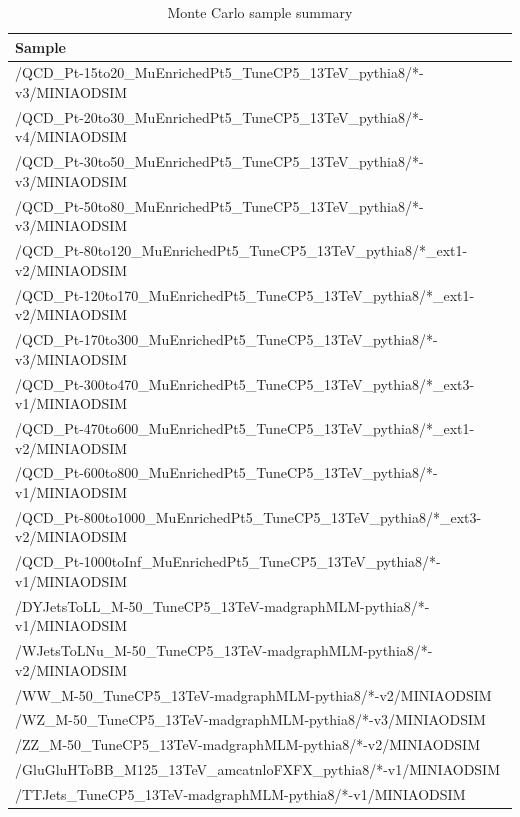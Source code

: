 \begin{table}[htb]
  \caption{Monte Carlo sample summary}
  \begin{center}
    \footnotesize
    \begin{tabular}{l}\hline
      Sample \\
      \hline
      /QCD\_Pt-15to20\_MuEnrichedPt5\_TuneCP5\_13TeV\_pythia8/*-v3/MINIAODSIM \\
      /QCD\_Pt-20to30\_MuEnrichedPt5\_TuneCP5\_13TeV\_pythia8/*-v4/MINIAODSIM \\
      /QCD\_Pt-30to50\_MuEnrichedPt5\_TuneCP5\_13TeV\_pythia8/*-v3/MINIAODSIM \\
      /QCD\_Pt-50to80\_MuEnrichedPt5\_TuneCP5\_13TeV\_pythia8/*-v3/MINIAODSIM \\
      /QCD\_Pt-80to120\_MuEnrichedPt5\_TuneCP5\_13TeV\_pythia8/*\_ext1-v2/MINIAODSIM \\
      /QCD\_Pt-120to170\_MuEnrichedPt5\_TuneCP5\_13TeV\_pythia8/*\_ext1-v2/MINIAODSIM \\
      /QCD\_Pt-170to300\_MuEnrichedPt5\_TuneCP5\_13TeV\_pythia8/*-v3/MINIAODSIM \\
      /QCD\_Pt-300to470\_MuEnrichedPt5\_TuneCP5\_13TeV\_pythia8/*\_ext3-v1/MINIAODSIM \\
      /QCD\_Pt-470to600\_MuEnrichedPt5\_TuneCP5\_13TeV\_pythia8/*\_ext1-v2/MINIAODSIM \\
      /QCD\_Pt-600to800\_MuEnrichedPt5\_TuneCP5\_13TeV\_pythia8/*-v1/MINIAODSIM \\
      /QCD\_Pt-800to1000\_MuEnrichedPt5\_TuneCP5\_13TeV\_pythia8/*\_ext3-v2/MINIAODSIM \\
      /QCD\_Pt-1000toInf\_MuEnrichedPt5\_TuneCP5\_13TeV\_pythia8/*-v1/MINIAODSIM \\
      /DYJetsToLL\_M-50\_TuneCP5\_13TeV-madgraphMLM-pythia8/*-v1/MINIAODSIM \\
      /WJetsToLNu\_M-50\_TuneCP5\_13TeV-madgraphMLM-pythia8/*-v2/MINIAODSIM \\
      /WW\_M-50\_TuneCP5\_13TeV-madgraphMLM-pythia8/*-v2/MINIAODSIM \\
      /WZ\_M-50\_TuneCP5\_13TeV-madgraphMLM-pythia8/*-v3/MINIAODSIM \\
      /ZZ\_M-50\_TuneCP5\_13TeV-madgraphMLM-pythia8/*-v2/MINIAODSIM \\
      /GluGluHToBB\_M125\_13TeV\_amcatnloFXFX\_pythia8/*-v1/MINIAODSIM \\
      /TTJets\_TuneCP5\_13TeV-madgraphMLM-pythia8/*-v1/MINIAODSIM \\

\end{tabular}
\end{center}
\end{table}
